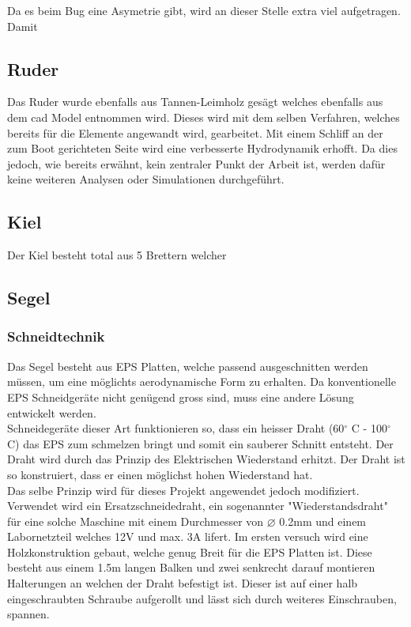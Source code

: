 Da es beim Bug eine Asymetrie gibt, wird an dieser Stelle extra viel aufgetragen. Damit 

\subsection{Ruder}
Das Ruder wurde ebenfalls aus Tannen-Leimholz gesägt welches ebenfalls aus dem \ac{cad} Model entnommen wird. Dieses wird mit dem selben Verfahren, welches bereits für die Elemente angewandt wird, gearbeitet. Mit einem Schliff an der zum Boot gerichteten Seite wird eine verbesserte Hydrodynamik erhofft. Da dies jedoch, wie bereits erwähnt, kein zentraler Punkt der Arbeit ist, werden dafür keine weiteren Analysen oder Simulationen durchgeführt.


\subsection{Kiel}
Der Kiel besteht total aus 5 Brettern welcher 


\subsection{Segel}
\subsubsection*{Schneidtechnik}
Das Segel besteht aus EPS Platten, welche passend ausgeschnitten werden müssen, um eine möglichts aerodynamische Form zu erhalten. Da konventionelle EPS Schneidgeräte nicht genügend gross sind, muss eine andere Lösung entwickelt werden.  \\
Schneidegeräte dieser Art funktionieren so, dass ein heisser Draht (60$^\circ$ C - 100$^\circ$ C) das EPS zum schmelzen bringt und somit ein sauberer Schnitt entsteht. Der Draht wird durch das Prinzip des Elektrischen Wiederstand erhitzt. Der Draht ist so konstruiert, dass er einen möglichst hohen Wiederstand hat. \\
Das selbe Prinzip wird für dieses Projekt angewendet jedoch modifiziert. Verwendet wird ein Ersatzschneidedraht, ein sogenannter "Wiederstandsdraht" für eine solche Maschine mit einem Durchmesser von $\varnothing$ 0.2mm und einem Labornetzteil welches 12V und max. 3A lifert.
Im ersten versuch wird eine Holzkonstruktion gebaut, welche genug Breit für die EPS Platten ist. Diese besteht aus einem 1.5m langen Balken und zwei senkrecht darauf montieren Halterungen an welchen der Draht befestigt ist. Dieser ist auf einer halb eingeschraubten Schraube aufgerollt und lässt sich durch weiteres Einschrauben, spannen. 


